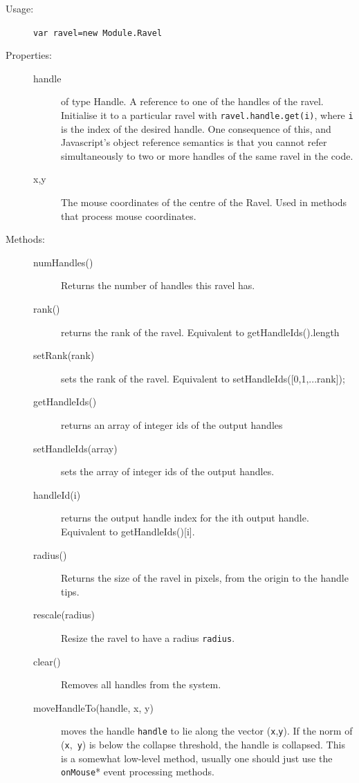 \documentclass{article}
\begin{document}
\begin{description}
\item[Usage:] \verb+var ravel=new Module.Ravel+
  
\item[Properties:]\mbox{}
  \begin{description}
  \item[handle] of type Handle. A reference to one of the handles of the
    ravel. Initialise it to a particular ravel with
    \verb+ravel.handle.get(i)+, where \verb+i+ is the index of the desired
    handle. One consequence of this, and Javascript's object reference
    semantics is that you cannot refer simultaneously to two or more
    handles of the same ravel in the code.
  \item[x,y] The mouse coordinates of the centre of the Ravel. Used in
    methods that process mouse coordinates.
  \end{description}
  
\item[Methods:]\mbox{}
  \begin{description}
  \item[numHandles()] Returns the number of handles this ravel has.
    
  \item[rank()] returns the rank of the ravel. Equivalent to getHandleIds().length
  \item[setRank(rank)] sets the rank of the ravel. Equivalent to
    setHandleIds([0,1,...rank]);
  \item[getHandleIds()] returns an array of integer ids of the output handles
  \item[setHandleIds(array)] sets the array of integer ids of the output
    handles.
  \item[handleId(i)] returns the output handle index for the ith output
    handle. Equivalent to getHandleIds()[i].
    
  \item[radius()] Returns the size of the ravel in pixels, from the origin
    to the handle tips.
  \item[rescale(radius)] Resize the ravel to have a radius {\tt radius}.
    
  \item[clear()] Removes all handles from the system.
    
  \item[moveHandleTo(handle, x, y)] moves the handle {\tt handle} to
    lie along the vector ({\tt x},{\tt y}). If the norm of ({\tt x},{\tt
      y}) is below the collapse threshold, the handle is collapsed. This is
    a somewhat low-level method, usually one should just use the {\tt
      onMouse}* event processing methods.
    

\end{description}
\end{description}
\end{document}
